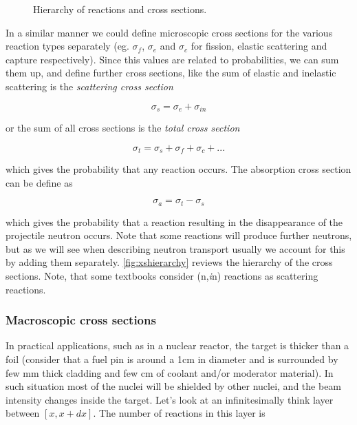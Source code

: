 
\begin{figure}[ht!]
\protect {}\protect
\caption{\label{fig:xshierarchy} \footnotesize{Hierarchy of reactions and cross sections.}}
\end{figure}

In a similar manner we could define microscopic cross sections for the various reaction types separately (eg. $\sigma_f$, $\sigma_e$ and $\sigma_c$ for fission, elastic scattering and capture respectively). Since this values are related to probabilities, we can sum them up, and define further cross sections, like the sum of elastic and inelastic scattering is the \textit{scattering cross section}

\[
\sigma_s=\sigma_e + \sigma_{in}
\]

or the sum of all cross sections is the \textit{total cross section}

\[
\sigma_t=\sigma_s + \sigma_{f}+ \sigma_{c} + ...
\]

which gives the probability that any reaction occurs. The absorption cross section can be define as 


\[
\sigma_a=\sigma_t - \sigma_s
\]

which gives the probability that a reaction resulting in the disappearance of the projectile neutron occurs. Note that some reactions will produce further neutrons, but as we will see when describing neutron transport usually we account for this by adding them separately. \autoref{fig:xshierarchy} reviews the hierarchy of the cross sections. Note, that some textbooks consider (n,\textit{i}n) reactions as scattering reactions.

\subsubsection{Macroscopic cross sections}

In practical applications, such as in a nuclear reactor, the target is thicker than a foil (consider that a fuel pin is around a 1cm in diameter and is surrounded by few mm thick cladding and few cm of coolant and/or moderator material). In such situation most of the nuclei will be shielded by other nuclei, and the beam intensity changes inside the target. Let's look at an infinitesimally think layer between $[x,x+dx]$. The number of reactions in this layer is

